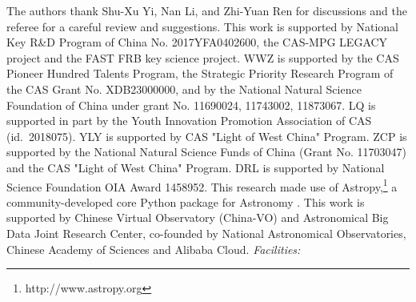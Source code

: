 \documentclass[iop,apj,numberedappendix,appendixfloats]{emulateapj}
\begin{document}




\acknowledgements
The authors thank Shu-Xu Yi, Nan Li, and Zhi-Yuan Ren for discussions and the referee for a careful review and suggestions.
This work is supported by National Key R\&D Program of China No.
2017YFA0402600, the CAS-MPG LEGACY project and the FAST FRB key science project. 
WWZ is supported by the CAS Pioneer Hundred Talents
Program, the Strategic Priority Research Program of the CAS Grant No. XDB23000000, and by the National Natural Science Foundation
of China under grant No. 11690024, 11743002, 11873067. 
LQ is supported in part by the Youth Innovation Promotion Association of CAS
(id.~2018075).
YLY is supported by CAS "Light of West China" Program.
ZCP is supported by the National Natural Science Funds of China (Grant No.
11703047) and the CAS "Light of West China" Program.
DRL is supported by National Science Foundation OIA Award 1458952.
This research made use of Astropy,\footnote{http://www.astropy.org} a community-developed core Python package for Astronomy \citep{astropy:2013, astropy:2018}. 
This work is supported by Chinese Virtual Observatory (China-VO) and Astronomical Big Data Joint Research Center, co-founded by National Astronomical Observatories, Chinese Academy of Sciences and Alibaba Cloud.
{\it Facilities:}


%

%

\end{document}
